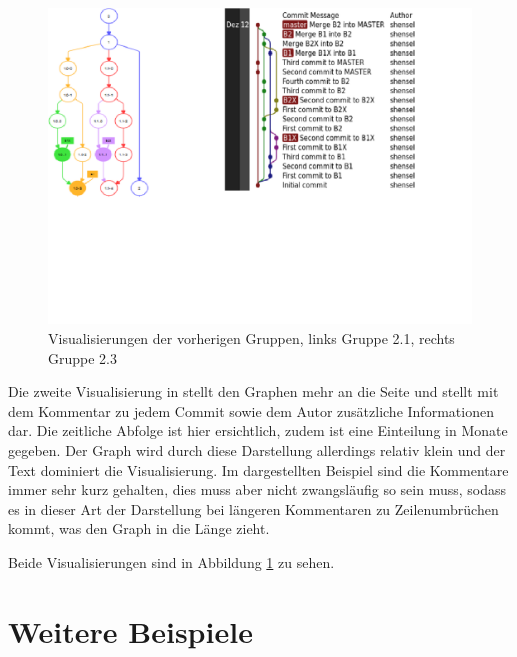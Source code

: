 \documentclass[nocolor]{tudbook}
\begin{document}
\begin{figure}[htbp] 
  \centering
     \includegraphics[width=1.2\textwidth]{Vorarbeiten.png}
  \caption[Visualisierungen der vorherigen Gruppen, links Gruppe 2.1 (aus \cite{Gruppe2.1}), rechts Gruppe 2.3 (aus \cite{Gruppe2.3})]{Visualisierungen der vorherigen Gruppen, links Gruppe 2.1, rechts Gruppe 2.3}
  \label{fig:Vorarbeiten}
\end{figure}

Die zweite Visualisierung in \cite{Gruppe2.3} stellt den Graphen mehr an die Seite und stellt mit dem Kommentar zu jedem Commit sowie dem Autor zusätzliche Informationen dar. Die zeitliche Abfolge ist hier ersichtlich, zudem ist eine Einteilung in Monate gegeben. Der Graph wird durch diese Darstellung allerdings relativ klein und der Text dominiert die Visualisierung. Im dargestellten Beispiel sind die Kommentare immer sehr kurz gehalten, dies muss aber nicht zwangsläufig so sein muss, sodass es in dieser Art der Darstellung bei längeren Kommentaren zu Zeilenumbrüchen kommt, was den Graph in die Länge zieht.  

Beide Visualisierungen sind in Abbildung \ref{fig:Vorarbeiten} zu sehen.

\section{Weitere Beispiele}
\label{sec:WeitereLiteratur}
\end{document}
